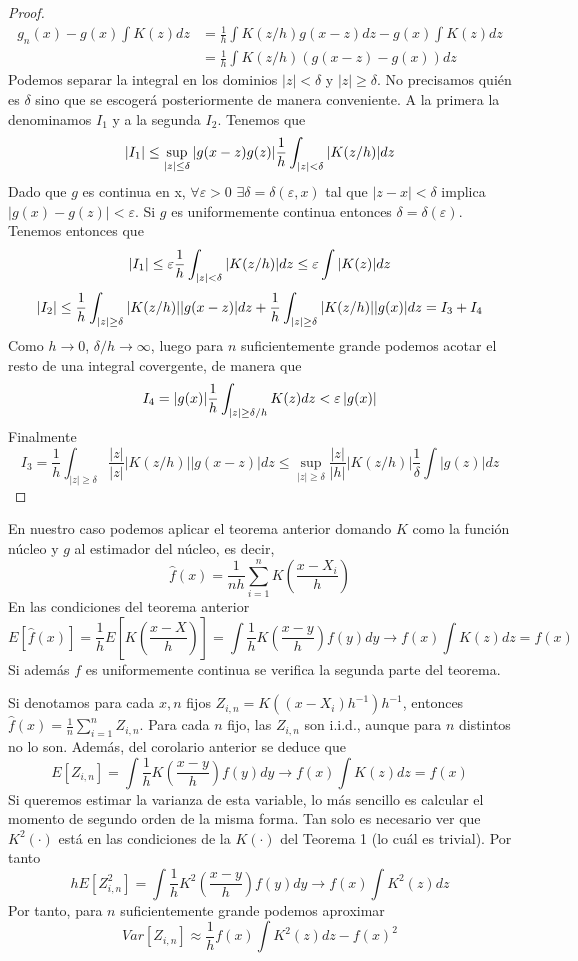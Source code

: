 \documentclass[MyPE.tex]{subfiles}
\begin{document}
\begin{proof}
\begin{align*}
g_n(x)-g(x)\int K(z)dz &=  \frac{1}{h}\int K(z/h)g(x-z)dz-g(x)\int K(z)dz \\
&=
  \frac{1}{h}\int K(z/h)(g(x-z)-g(x))dz 
\end{align*}
Podemos separar la integral en los dominios $|z|<\delta$ y $|z|\geq \delta$. No precisamos quién es $\delta$ sino que se escogerá posteriormente de manera conveniente. A la primera la denominamos $I_1$ y a la segunda $I_2$. Tenemos que
$$
\left\lvert I_1\right\rvert \leq \sup_{|z|\leq \delta} |g(x-z)g(z)|\frac{1}{h} \int_{|z|<\delta} |K(z/h)|dz
$$
\newpage
Dado que $g$ es continua en x, $\forall \varepsilon >0$ $\exists \delta=\delta(\varepsilon,x)$ tal que $|z-x|<\delta$ implica $|g(x)-g(z)| < \varepsilon$. Si $g$ es uniformemente continua entonces $\delta = \delta(\varepsilon)$. Tenemos entonces que
$$
\left\lvert I_1\right\rvert \leq \varepsilon \frac{1}{h}  \int_{|z|<\delta} |K(z/h)|dz \leq \varepsilon \int|K(z)|dz
$$
$$
\left\lvert I_2\right\rvert \leq \frac{1}{h} \int_{|z|\geq \delta} |K(z/h)||g(x-z)|dz + \frac{1}{h} \int_{|z|\geq \delta} |K(z/h)||g(x)|dz = I_3 + I_4 
$$
Como $h \to 0$, $\delta/h\to \infty$, luego para $n$ suficientemente grande podemos acotar el resto de una integral covergente, de manera que
$$
I_4 = |g(x)|\frac{1}{h} \int_{|z|\geq \delta/h} K(z)dz < \varepsilon \left\lvert g(x)\right\rvert
$$
Finalmente
$$
I_3 = \frac{1}{h} \int_{|z|\geq \delta} \frac{|z|}{|z|}|K(z/h)||g(x-z)|dz \leq \sup_{|z|\geq \delta} \frac{|z|}{|h|} |K(z/h)| \frac{1}{\delta} \int|g(z)|dz
$$

\end{proof}
\begin{coro}
En nuestro caso podemos aplicar el teorema anterior domando $K$ como la función núcleo y $g$ al estimador del núcleo, es decir,
$$
\hat{f}(x) = \frac{1}{nh}\sum_{i=1}^n K\left(\frac{x-X_i}{h}\right)
$$
En las condiciones del teorema anterior
$$
E[\hat{f}(x)] = \frac{1}{h}E\left[K\left(\frac{x-X}{h}\right)\right] = \int \frac{1}{h} K\left(\frac{x-y}{h}\right) f(y) dy \to f(x) \int K(z)dz = f(x)$$
Si además $f$ es uniformemente continua se verifica la segunda parte del teorema.
\end{coro}
\begin{coro}
Si denotamos para cada $x,n$ fijos $Z_{i,n} = K((x-X_i)h^{-1})h^{-1}$, entonces $\hat{f}(x) = \frac{1}{n}\sum_{i=1}^n Z_{i,n}$. Para cada $n$ fijo, las $Z_{i,n}$ son i.i.d., aunque para $n$ distintos no lo son. Además, del corolario anterior se deduce que
$$
E[Z_{i,n}] = \int\frac{1}{h} K\left(\frac{x-y}{h}\right) f(y) dy \to f(x) \int K(z)dz = f(x)
$$
Si queremos estimar la varianza de esta variable, lo más sencillo es calcular el momento de segundo orden de la misma forma. Tan solo es necesario ver que $K^2(\cdot)$ está en las condiciones de la $K(\cdot)$ del Teorema 1 (lo cuál es trivial). Por tanto
$$
hE[Z_{i,n}^2] = \int\frac{1}{h} K^2\left(\frac{x-y}{h}\right) f(y) dy \to f(x) \int K^2(z)dz
$$
Por tanto, para $n$ suficientemente grande podemos aproximar
$$
Var[Z_{i,n}] \approx \frac{1}{h}f(x) \int K^2(z)dz - f(x)^2
$$
\end{coro}
\end{document}
